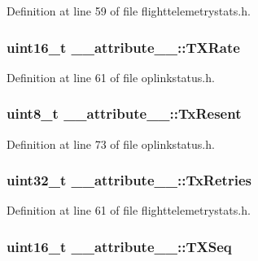 \-Definition at line 59 of file flighttelemetrystats.\-h.

\hypertarget{struct____attribute_____ab0bd2d176de1dfdd627fc05f0ab8a4e2}{
\subsubsection[{\-T\-X\-Rate}]{\setlength{\rightskip}{0pt plus 5cm}uint16\-\_\-t {\bf \-\_\-\-\_\-attribute\-\_\-\-\_\-\-::\-T\-X\-Rate}}}\label{struct____attribute_____ab0bd2d176de1dfdd627fc05f0ab8a4e2}


\-Definition at line 61 of file oplinkstatus.\-h.

\hypertarget{struct____attribute_____a356c57468e6cffc2be558173e2701561}{
\subsubsection[{\-Tx\-Resent}]{\setlength{\rightskip}{0pt plus 5cm}uint8\-\_\-t {\bf \-\_\-\-\_\-attribute\-\_\-\-\_\-\-::\-Tx\-Resent}}}\label{struct____attribute_____a356c57468e6cffc2be558173e2701561}


\-Definition at line 73 of file oplinkstatus.\-h.

\hypertarget{struct____attribute_____a737757725531fcd0ea9353c2efd9e559}{
\subsubsection[{\-Tx\-Retries}]{\setlength{\rightskip}{0pt plus 5cm}uint32\-\_\-t {\bf \-\_\-\-\_\-attribute\-\_\-\-\_\-\-::\-Tx\-Retries}}}\label{struct____attribute_____a737757725531fcd0ea9353c2efd9e559}


\-Definition at line 61 of file flighttelemetrystats.\-h.

\hypertarget{struct____attribute_____aea915d362237fb573eb3f831bad4103c}{
\subsubsection[{\-T\-X\-Seq}]{\setlength{\rightskip}{0pt plus 5cm}uint16\-\_\-t {\bf \-\_\-\-\_\-attribute\-\_\-\-\_\-\-::\-T\-X\-Seq}}}\label{struct____attribute_____aea915d362237fb573eb3f831bad4103c}



